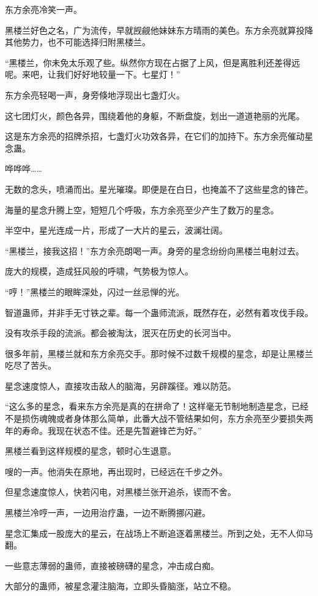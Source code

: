 \begin{this_body}
东方余亮冷笑一声。

黑楼兰好色之名，广为流传，早就觊觎他妹妹东方晴雨的美色。东方余亮就算投降其他势力，也不可能选择归附黑楼兰。

“黑楼兰，你未免太乐观了些。纵然你方现在占据了上风，但是离胜利还差得远呢。来吧，让我们好好地较量一下。七星灯！”

东方余亮轻喝一声，身旁倏地浮现出七盏灯火。

这七团灯火，颜色各异，围绕着他的身躯，不断盘旋，划出一道道艳丽的光尾。

这是东方余亮的招牌杀招，七盏灯火功效各异，在它们的加持下。东方余亮催动星念蛊。

哗哗哗……

无数的念头，喷涌而出。星光璀璨。即便是在白日，也掩盖不了这些星念的锋芒。

海量的星念升腾上空，短短几个呼吸，东方余亮至少产生了数万的星念。

半空中，星光连成一片，形成了一大片的星云，波澜壮阔。

“黑楼兰，接我这招！”东方余亮朗喝一声。身旁的星念纷纷向黑楼兰电射过去。

庞大的规模，造成狂风般的呼啸，气势极为惊人。

“哼！”黑楼兰的眼眸深处，闪过一丝忌惮的光。

智道蛊师，并非手无寸铁之辈。每一个蛊师流派，既然存在，必然有着攻伐手段。

没有攻杀手段的流派。都会被淘汰，泯灭在历史的长河当中。

很多年前，黑楼兰就和东方余亮交手。那时候不过数千规模的星念，却是让黑楼兰吃尽了苦头。

星念速度惊人，直接攻击敌人的脑海，另辟蹊径。难以防范。

“这么多的星念，看来东方余亮是真的在拼命了！这样毫无节制地制造星念，已经不是损伤魂魄或者身体那么简单，此番大战不管结果如何，东方余亮至少要损失两年的寿命。我现在状态不佳。还是先暂避锋芒为好。”

黑楼兰看到这样规模的星念，顿时心生退意。

嗖的一声。他消失在原地，再出现时，已经远在千步之外。

但星念速度惊人，快若闪电，对黑楼兰张开追杀，锲而不舍。

黑楼兰冷哼一声，一边用治疗蛊，一边不断腾挪闪避。

星念汇集成一股庞大的星云，在战场上不断追逐着黑楼兰。所到之处，无不人仰马翻。

一些意志薄弱的蛊师，直接被磅礴的星念，冲击成白痴。

大部分的蛊师，被星念灌注脑海，立即头昏脑涨，站立不稳。


\end{this_body}

